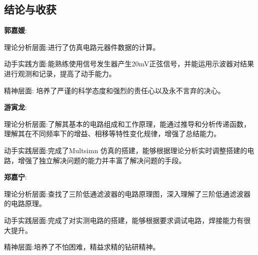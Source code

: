 \documentclass[./测控三级项目.tex]{subfiles} %
\begin{document}
	\subsection{结论与收获}
		\textbf{郭嘉媛}:\par
		理论分析层面:进行了仿真电路元器件数据的计算。\par
		动手实践方面:能熟练使用信号发生器产生20mV正弦信号，并能运用示波器对结果进行观测和记录，提高了动手能力。\par
		精神层面: 培养了严谨的科学态度和强烈的责任心以及永不言弃的决心。\par
		\textbf{游寅龙}:\par
		理论分析层面:了解其基本的电路组成和工作原理，能通过推导和分析传递函数，理解其在不同频率下的增益、相移等特性变化规律，增强了总结能力。\par
		动手实践层面:完成了Multsimn 仿真的搭建，能够根据理论分析实时调整搭建的电路，增强了独立解决问题的能力并丰富了解决问题的手段。\par
		\textbf{郑嘉宁}:\par
		理论分析层面:查找了三阶低通滤波器的电路原理图，深入理解了三阶低通滤波器的电路原理。\par
		动手实践层面:完成了对实测电路的搭建，能够根据要求调试电路，焊接能力有很大提升。\par
		精神层面:培养了不怕困难，精益求精的钻研精神。
	
	
	
\end{document}

